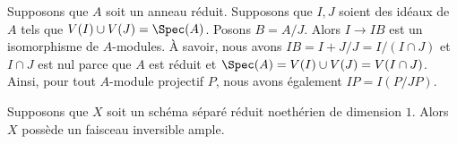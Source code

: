 \begin{remark}
\label{remark-conductor}
Supposons que $A$ soit un anneau réduit. Supposons que $I, J$ soient
des idéaux de $A$ tels que $V(I) \cup V(J) = \Spec(A)$. Posons $B =
A/J$. Alors $I \to IB$ est un isomorphisme de $A$-modules. À savoir,
nous avons $IB = I + J/J = I/(I \cap J)$ et $I \cap J$ est nul parce
que $A$ est réduit et $\Spec(A) = V(I) \cup V(J) = V(I \cap J)$. Ainsi,
pour tout $A$-module projectif $P$, nous avons également $IP = I(P/JP)$.
\end{remark}

\begin{lemma}
\label{lemma-dim-1-noetherian-reduced-separated-has-ample}
Supposons que $X$ soit un schéma séparé réduit noethérien de
dimension $1$. Alors $X$ possède un faisceau inversible ample.
\end{lemma}

